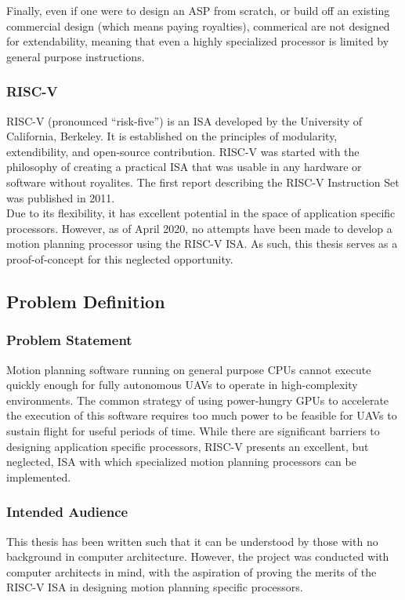         Finally, even if one were to design an \gls{ASP} from scratch, or build off an existing commercial design (which means paying royalties), commerical  are not designed for extendability, meaning that even a highly specialized processor is limited by general purpose instructions.

    \subsubsection{RISC-V}
        RISC-V (pronounced ``risk-five'') is an \gls{ISA} developed by the University of California, Berkeley. It is established on the principles of modularity, extendibility, and open-source contribution. RISC-V was started with the philosophy of creating a practical \gls{ISA} that was usable in any hardware or software without royalites. The first report describing the RISC-V Instruction Set was published in 2011\cite{Isa2012}. \\

        Due to its flexibility, it has excellent potential in the space of application specific processors. However, as of April 2020, no attempts have been made to develop a motion planning processor using the RISC-V \gls{ISA}. As such, this thesis serves as a proof-of-concept for this neglected opportunity.
    

\newpage
\subsection{Problem Definition}

    \subsubsection*{Problem Statement}
    Motion planning software running on general purpose \gls{CPU}s cannot execute quickly enough for fully autonomous \gls{UAV}s to operate in high-complexity environments. The common strategy of using power-hungry \gls{GPU}s to accelerate the execution of this software requires too much power to be feasible for \gls{UAV}s to sustain flight for useful periods of time. While there are significant barriers to designing application specific processors, RISC-V presents an excellent, but neglected, \gls{ISA} with which specialized motion planning processors can be implemented. 

    \subsubsection*{Intended Audience}
    This thesis has been written such that it can be understood by those with no background in computer architecture. However, the project was conducted with computer architects in mind, with the aspiration of proving the merits of the RISC-V ISA in designing motion planning specific processors.